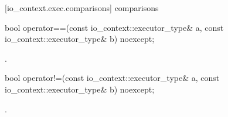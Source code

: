 [io_context.exec.comparisons]{ comparisons}

\begin{itemdecl}
bool operator==(const io_context::executor_type& a,
                const io_context::executor_type& b) noexcept;
\end{itemdecl}

\begin{itemdescr}
\pnum
\returns {}.
\end{itemdescr}

\begin{itemdecl}
bool operator!=(const io_context::executor_type& a,
                const io_context::executor_type& b) noexcept;
\end{itemdecl}

\begin{itemdescr}
\pnum
\returns {}.
\end{itemdescr}




